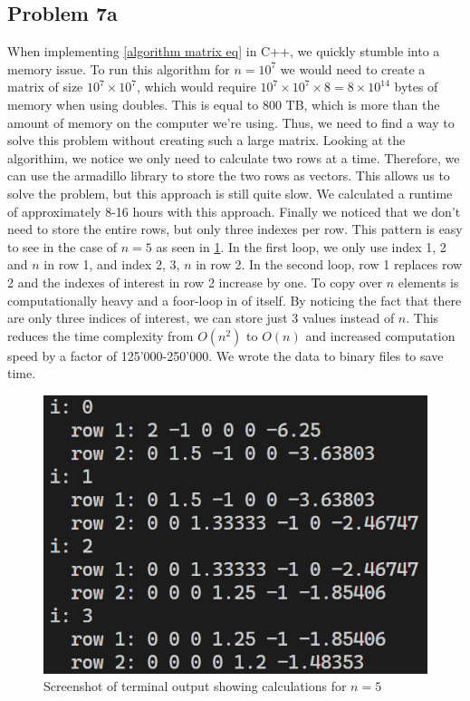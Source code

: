 \documentclass[english,notitlepage]{revtex4-1}  %
\begin{document}
\subsection*{Problem 7a}
When implementing \cref{algorithm matrix eq} in C++, we quickly stumble into a memory issue. To run this algorithm for $n=10^7$ we would need to create a matrix of size $10^7 \times 10^7$, which would require $10^7 \times 10^7 \times 8 = 8 × 10^{14}$ bytes of memory when using doubles. This is equal to 800 TB, which is more than the amount of memory on the computer we're using. Thus, we need to find a way to solve this problem without creating such a large matrix. Looking at the algorithim, we notice we only need to calculate two rows at a time. Therefore, we can use the armadillo library to store the two rows as vectors. This allows us to solve the problem, but this approach is still quite slow. We calculated a runtime of approximately 8-16 hours with this approach. Finally we noticed that we don't need to store the entire rows, but only three indexes per row. This pattern is easy to see in the case of $n=5$ as seen in \cref{fig: vector_example}. In the first loop, we only use index 1, 2 and $n$ in row 1, and index 2, 3, $n$ in row 2. In the second loop, row 1 replaces row 2 and the indexes of interest in row 2 increase by one. To copy over $n$ elements is computationally heavy and a foor-loop in of itself. By noticing the fact that there are only three indices of interest, we can store just 3 values instead of $n$. This reduces the time complexity from $O(n^2)$ to $O(n)$ and increased computation speed by a factor of 125'000-250'000. We wrote the data to binary files to save time.

\begin{figure}
    \centering
    \includegraphics[scale=0.5]{vector_example.png}
    \caption{Screenshot of terminal output showing calculations for $n = 5$}
    \label{fig: vector_example}
\end{figure}
\end{document}

